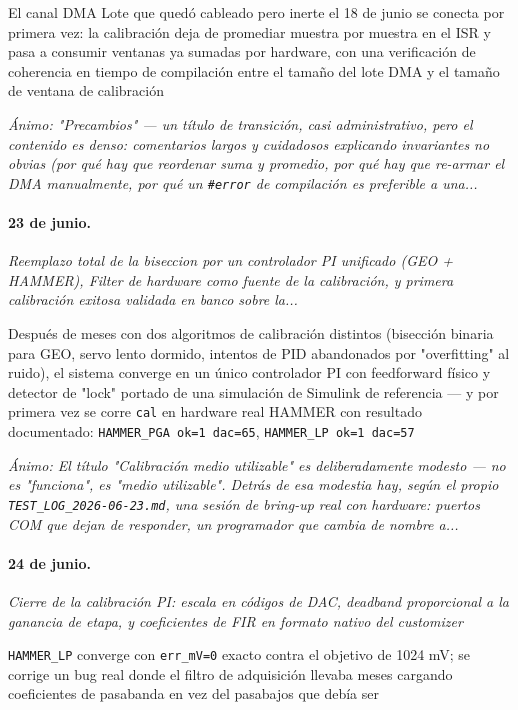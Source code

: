El canal DMA Lote que quedó cableado pero inerte el 18 de junio se conecta por primera vez: la calibración deja de promediar muestra por muestra en el ISR y pasa a consumir ventanas ya sumadas por hardware, con una verificación de coherencia en tiempo de compilación entre el tamaño del lote DMA y el tamaño de ventana de calibración

{\footnotesize\itshape \'Animo: "Precambios" --- un título de transición, casi administrativo, pero el contenido es denso: comentarios largos y cuidadosos explicando invariantes no obvias (por qué hay que reordenar suma y promedio, por qué hay que re-armar el DMA manualmente, por qué un \texttt{\#error} de compilación es preferible a una...}

\paragraph{23 de junio.}
\emph{Reemplazo total de la biseccion por un controlador PI unificado (GEO + HAMMER), Filter de hardware como fuente de la calibración, y primera calibración exitosa validada en banco sobre la...}

Después de meses con dos algoritmos de calibración distintos (bisección binaria para GEO, servo lento dormido, intentos de PID abandonados por "overfitting" al ruido), el sistema converge en un único controlador PI con feedforward físico y detector de "lock" portado de una simulación de Simulink de referencia --- y por primera vez se corre \texttt{cal} en hardware real HAMMER con resultado documentado: \texttt{HAMMER\_PGA ok=1 dac=65}, \texttt{HAMMER\_LP ok=1 dac=57}

{\footnotesize\itshape \'Animo: El título "Calibración medio utilizable" es deliberadamente modesto --- no es "funciona", es "medio utilizable". Detrás de esa modestia hay, según el propio \texttt{TEST\_LOG\_2026-06-23.md}, una sesión de bring-up real con hardware: puertos COM que dejan de responder, un programador que cambia de nombre a...}

\paragraph{24 de junio.}
\emph{Cierre de la calibración PI: escala en códigos de DAC, deadband proporcional a la ganancia de etapa, y coeficientes de FIR en formato nativo del customizer}

\texttt{HAMMER\_LP} converge con \texttt{err\_mV=0} exacto contra el objetivo de 1024 mV; se corrige un bug real donde el filtro de adquisición llevaba meses cargando coeficientes de pasabanda en vez del pasabajos que debía ser

